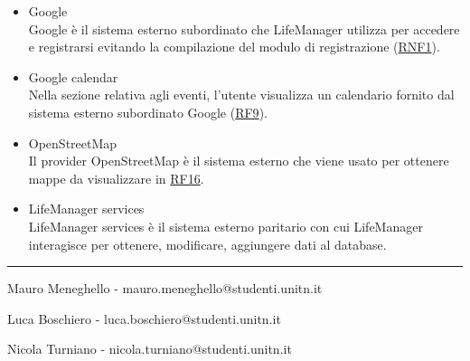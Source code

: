 \documentclass[a4paper,12pt]{article}
\begin{document}
\begin{itemize}
  
 \item {\sffamily Google}\\
    Google è il sistema esterno subordinato che LifeManager utilizza per accedere e registrarsi evitando la compilazione del modulo di registrazione (\hyperlink{RNF1}{RNF1}).  
 
 \item {\sffamily Google calendar}\\
    Nella sezione relativa agli eventi, l'utente visualizza un calendario fornito dal sistema esterno subordinato Google (\hyperlink{RF9}{RF9}). 
 
 \item {\sffamily OpenStreetMap}\\
    Il provider OpenStreetMap è il sistema esterno che viene usato per ottenere mappe da visualizzare in \hyperlink{RF16}{RF16}.

\item {\sffamily LifeManager services}\\
    LifeManager services è il sistema esterno paritario con cui LifeManager interagisce per ottenere, modificare, aggiungere dati al database. 

\end{itemize}

\vspace{0.5cm}
\hrule
\vspace{0.5cm}


Mauro Meneghello - mauro.meneghello@studenti.unitn.it

Luca Boschiero -  luca.boschiero@studenti.unitn.it

Nicola Turniano - nicola.turniano@studenti.unitn.it

 
\end{document}
